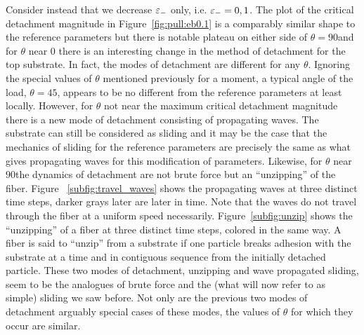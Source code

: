 Consider instead that we decrease $\varepsilon_-$ only, i.e. $\varepsilon_-=0,1$. The plot of the critical detachment magnitude in Figure~\ref{fig:pull:eb0.1} is a comparably similar shape to the reference parameters but there is notable plateau on either side of $\theta=90$\textdegree and for $\theta$ near $0$ there is an interesting change in the method of detachment for the top substrate. In fact, the modes of detachment are different for any $\theta$. Ignoring the special values of $\theta$ mentioned previously for a moment, a typical angle of the load, $\theta=45$\textdegree, appears to be no different from the reference parameters at least locally. However, for $\theta$ not near the maximum critical detachment magnitude there is a new mode of detachment consisting of propagating waves. The substrate can still be considered as sliding and it may be the case that the mechanics of sliding for the reference parameters are precisely the same as what gives propagating waves for this modification of parameters. Likewise, for $\theta$ near $90$\textdegree the dynamics of detachment are not brute force but an ``unzipping'' of the fiber. Figure  ~\ref{subfig:travel_waves} shows the propagating waves at three distinct time steps, darker grays later are later in time. Note that the waves do not travel through the fiber at a uniform speed necessarily. Figure~\ref{subfig:unzip} shows the ``unzipping'' of a fiber at three distinct time steps, colored in the same way. A fiber is said to ``unzip'' from a substrate if one particle breaks adhesion with the substrate at a time and in contiguous sequence from the initially detached particle. These two modes of detachment, unzipping and wave propagated sliding, seem to be the analogues of brute force and the (what will now refer to as simple) sliding we saw before. Not only are the previous two modes of detachment arguably special cases of these modes, the values of $\theta$ for which they occur are similar.

